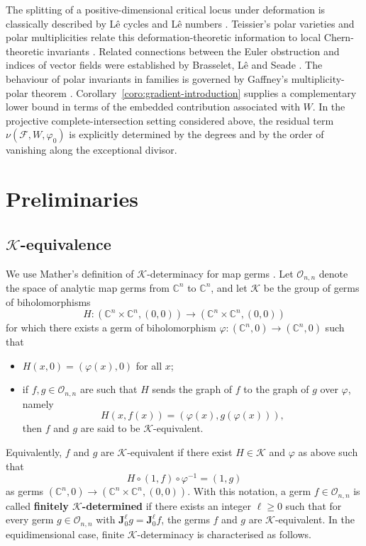 \documentclass[10pt,twoside]{amsart}
\numberwithin{equation}{section}
\theoremstyle{definition}
\theoremstyle{remark}
\newcommand{\kk}{\mathcal{K}}
\newcommand{\fol}{\mathcal{F}}
\begin{document}
The splitting of a positive-dimensional critical locus under deformation is classically described by L\^e cycles and L\^e numbers \cite{MasseyLeCycles}. Teissier's polar varieties and polar multiplicities relate this deformation-theoretic information to local Chern-theoretic invariants \cite{LeTeissier81}. Related connections between the Euler obstruction and indices of vector fields were established by Brasselet, L\^e and Seade \cite{BLS}.  The behaviour of polar invariants in families is governed by Gaffney's multiplicity-polar theorem \cite{Gaffney92,Gaffney93}. Corollary~\ref{coro:gradient-introduction} supplies a complementary lower bound in terms of the embedded contribution associated with $W$. In the projective complete-intersection setting considered above, the residual term $\nu(\fol,W,\varphi_0)$ is explicitly determined by the degrees and by the order of vanishing along the exceptional divisor.

\section{Preliminaries}

\subsection{$\kk$-equivalence}
We use Mather's definition of $\mathcal K$-determinacy for map germs \cite{MT1,MT2}. Let $\mathcal O_{n,n}$ denote the space of analytic map germs from $\mathbb C^n$ to $\mathbb C^n$, and let $\mathcal K$ be the group of germs of biholomorphisms
\[
H:(\mathbb{C}^n\times \mathbb{C}^n,(0,0))\longrightarrow (\mathbb{C}^n\times \mathbb{C}^n,(0,0))
\]
for which there exists a germ of biholomorphism $\varphi:(\mathbb{C}^n,0)\to (\mathbb{C}^n,0)$ such that
\begin{itemize}
\item[(i)] $H(x,0)=(\varphi(x),0)$ for all $x$;
\item[(ii)] if $f,g\in\mathcal{O}_{n,n}$ are such that $H$ sends the graph of $f$ to the graph of $g$ over $\varphi$, namely
\[
H(x,f(x))=(\varphi(x),g(\varphi(x))),
\]
then $f$ and $g$ are said to be $\mathcal{K}$-equivalent.
\end{itemize}
Equivalently, $f$ and $g$ are $\mathcal{K}$-equivalent if there exist $H\in\mathcal{K}$ and $\varphi$ as above such that
\[
H\circ (1,f)\circ \varphi^{-1}=(1,g)
\]
as germs $(\mathbb{C}^n,0)\to(\mathbb{C}^n\times \mathbb{C}^n,(0,0))$.
With this notation, a germ $f\in\mathcal{O}_{n,n}$ is called \textbf{finitely $\mathcal{K}$-determined} if there exists an integer $\ell\geq 0$ such that for every germ $g\in\mathcal{O}_{n,n}$ with $\mathbf{J}_0^{\ell}g=\mathbf{J}_0^{\ell}f$, the germs $f$ and $g$ are $\mathcal{K}$-equivalent.
In the equidimensional case, finite $\mathcal K$-determinacy is characterised as follows.
\end{document}
